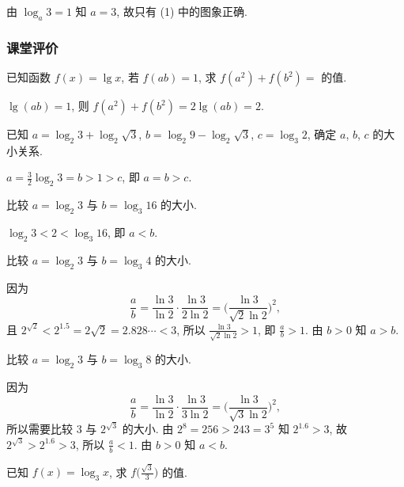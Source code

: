   \beginsolution
    由 $\log_a 3=1$ 知 $a=3$, 故只有 (1) 中的图象正确.
  \endsolution
  
  \subsubsection{课堂评价}
  \begin{exercise}
    已知函数 $f(x)=\lg x$, 若 $f(ab)=1$, 求 $f(a^2)+f(b^2)=$ 的值.
  \end{exercise}

  \beginsolution
    $\lg(ab)=1$, 则 $f(a^2)+f(b^2)=2\lg(ab)=2$.
  \endsolution
  
  \begin{exercise}
    已知 $a=\log_2 3+\log_2\sqrt3$, $b=\log_2 9-\log_2\sqrt3$, 
    $c=\log_3 2$, 确定 $a$, $b$, $c$ 的大小关系.
  \end{exercise}

  \beginsolution
    $a=\frac32\log_2 3=b>1>c$, 即 $a=b>c$.
    
    \varexercise 比较 $a=\log_2 3$ 与 $b=\log_3 16$ 的大小.
    
    $\log_2 3<2< \log_3 16$, 即 $a<b$.
    
    \varexercise 比较 $a=\log_2 3$ 与 $b=\log_3 4$ 的大小.
    
    因为 
    \[\frac{a}b= \frac{\ln3}{\ln2}\cdot \frac{\ln3}{2\ln2}
      =\Big(\frac{\ln3}{\sqrt2\ln2}\Big)^2,\]
    且 $2^{\sqrt2}< 2^{1.5}= 2\sqrt2= 2.828\cdots< 3$, 所以 $\frac{\ln3}{\sqrt2\ln2}>1$, 即 $\frac{a}b>1$. 由 $b>0$ 知 $a>b$.
    
    \varexercise 比较 $a=\log_2 3$ 与 $b=\log_3 8$ 的大小.
    
    因为 
    \[\frac{a}b= \frac{\ln3}{\ln2}\cdot \frac{\ln3}{3\ln2}
      =\Big(\frac{\ln3}{\sqrt3\ln2}\Big)^2,\]
    所以需要比较 $3$ 与 $2^{\sqrt3}$ 的大小. 由 $2^8=256>243=3^5$ 知 $2^{1.6}>3$, 故 $2^{\sqrt3}>2^{1.6}>3$, 所以 $\frac{a}b<1$. 由 $b>0$ 知 $a<b$.
  \endsolution
  
  \begin{exercise}
    已知 $f(x)=\log_3 x$, 求 $f\Big(\frac{\sqrt3}3\Big)$ 的值.
  \end{exercise}

